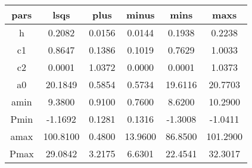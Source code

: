 \begin{table}
\begin{tabular}{cccccc}
\hline \hline
pars & lsqs & plus & minus & mins & maxs \\
\hline
h & 0.2082 & 0.0156 & 0.0144 & 0.1938 & 0.2238 \\
c1 & 0.8647 & 0.1386 & 0.1019 & 0.7629 & 1.0033 \\
c2 & 0.0001 & 1.0372 & 0.0000 & 0.0001 & 1.0373 \\
a0 & 20.1849 & 0.5854 & 0.5734 & 19.6116 & 20.7703 \\
amin & 9.3800 & 0.9100 & 0.7600 & 8.6200 & 10.2900 \\
Pmin & -1.1692 & 0.1281 & 0.1316 & -1.3008 & -1.0411 \\
amax & 100.8100 & 0.4800 & 13.9600 & 86.8500 & 101.2900 \\
Pmax & 29.0842 & 3.2175 & 6.6301 & 22.4541 & 32.3017 \\
\hline
\end{tabular}
\end{table}
